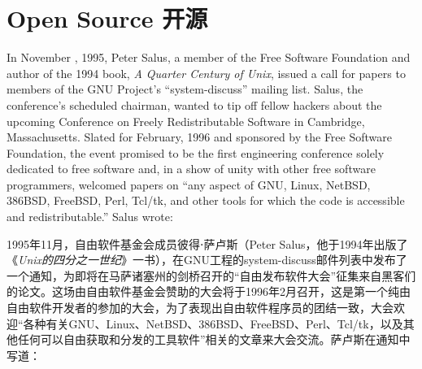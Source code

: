 
\chapter{\ifdefined\eng
Open Source
\fi
\ifdefined\chs
开源
\fi} \label{chapter:open source}
\thispagestyle{empty}


\ifdefined\eng
In November , 1995, Peter Salus, a member of the Free Software Foundation and author of the 1994 book, \textit{A Quarter Century of Unix}, issued a call for papers to members of the GNU Project's ``system-discuss'' mailing list. Salus, the conference's scheduled chairman, wanted to tip off fellow hackers about the upcoming Conference on Freely Redistributable Software in Cambridge, Massachusetts. Slated for February, 1996 and sponsored by the Free Software Foundation, the event promised to be the first engineering conference solely dedicated to free software and, in a show of unity with other free software programmers, welcomed papers on ``any aspect of GNU, Linux, NetBSD, 386BSD, FreeBSD, Perl, Tcl/tk, and other tools for which the code is accessible and redistributable.'' Salus wrote:
\fi

\ifdefined\chs
1995年11月，自由软件基金会成员彼得⋅萨卢斯（Peter Salus，他于1994年出版了《\textit{Unix的四分之一世纪}》一书），在GNU工程的system-discuss邮件列表中发布了一个通知，为即将在马萨诸塞州的剑桥召开的``自由发布软件大会''征集来自黑客们的论文。这场由自由软件基金会赞助的大会将于1996年2月召开，这是第一个纯由自由软件开发者的参加的大会，为了表现出自由软件程序员的团结一致，大会欢迎``各种有关GNU、Linux、NetBSD、386BSD、FreeBSD、Perl、Tcl/tk，以及其他任何可以自由获取和分发的工具软件''相关的文章来大会交流。萨卢斯在通知中写道：
\fi

